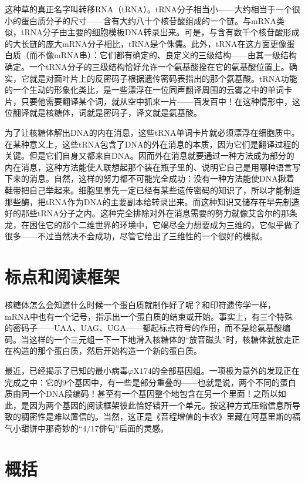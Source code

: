 这种草的真正名字叫转移RNA（tRNA）。tRNA分子相当小——大约相当于一个很小的蛋白质分子的尺寸——含有大约八十个核苷酸组成的一个链。与mRNA类似，tRNA分子由主要的细胞模板DNA转录出来。可是，与含有数千个核苷酸形成的大长链的庞大mRNA分子相比，tRNA是个侏儒。此外，tRNA在这方面更像蛋白质（而不像mRNA串）：它们都有确定的、良定义的三级结构——由其一级结构确定。一个tRNA分子的三级结构恰好允许一个氨基酸拴在它的氨基酸位置上。确实，它就是对面叶片上的反密码子根据遗传密码表指出的那个氨基酸。tRNA功能的一个生动的形象化类比，是一些漂浮在一位同声翻译周围的云雾之中的单词卡片，只要他需要翻译某个词，就从空中抓来一片——百发百中！在这种情形中，这位翻译就是核糖体，词就是密码子，译文就是氨基酸。

为了让核糖体解出DNA的内在消息，这些tRNA单词卡片就必须漂浮在细胞质中。在某种意义上，这些tRNA包含了DNA的外在消息的本质，因为它们是翻译过程的关键。但是它们自身又都来自DNA。因而外在消息就要通过一种方法成为部分的内在消息，这种方法能使人联想起那个装在瓶子里的、说明它自己是用哪种语言写下来的消息。自然，这样的努力都不可能完全成功：没有一种方法能使DNA揪着鞋带把自己举起来。细胞里事先一定已经有某些遗传密码的知识了，所以才能制造那些酶，把tRNA作为DNA的主要副本给转录出来。而这种知识又储存在早先制造好的那些tRNA分子之内。这种完全排除对外在消息需要的努力就像艾舍尔的那条龙，在困住它的那个二维世界的环境中，它竭尽全力想要成为三维的，它似乎做了很多——不过当然决不会成功，尽管它给出了三维性的一个很好的模拟。

\section{标点和阅读框架}

核糖体怎么会知道什么时候一个蛋白质就制作好了呢？和印符遗传学一样，mRNA中也有一个记号，指示出一个蛋白质的结束或开始。事实上，有三个特殊的密码子——UAA、UAG、UGA——都起标点符号的作用，而不是给氨基酸编码。当这样的一个三元组一下一下地滑入核糖体的“放音磁头”时，核糖体就放走正在构造的那个蛋白质，然后开始构造一个新的蛋白质。

最近，已经揭示了已知的最小病毒$\varphi\mathrm{X}174$的全部基因组。一项极为意外的发现正在完成之中：它的$9$个基因中，有一些是部分重叠的——也就是说，两个不同的蛋白质由同一个DNA段编码！甚至有一个基因整个地包含在另一个里面！之所以如此，是因为两个基因的阅读框架彼此恰好错开一个单元。按这种方式压缩信息所导致的稠密性是难以置信的。当然，这正是《音程增值的卡农》里藏在阿基里斯的福气小甜饼中那奇妙的“$4/17$俳句”后面的灵感。

\section{概括}

